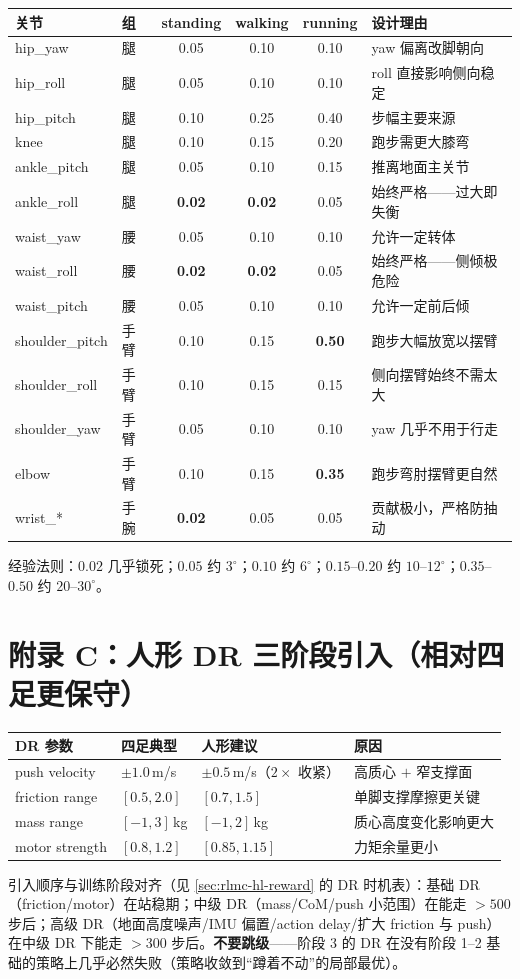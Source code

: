 \begin{center}
\small
\begin{tabular}{llccc l}
\hline
关节 & 组 & standing & walking & running & 设计理由 \\
\hline
hip\_yaw & 腿 & 0.05 & 0.10 & 0.10 & yaw 偏离改脚朝向 \\
hip\_roll & 腿 & 0.05 & 0.10 & 0.10 & roll 直接影响侧向稳定 \\
hip\_pitch & 腿 & 0.10 & 0.25 & 0.40 & 步幅主要来源 \\
knee & 腿 & 0.10 & 0.15 & 0.20 & 跑步需更大膝弯 \\
ankle\_pitch & 腿 & 0.05 & 0.10 & 0.15 & 推离地面主关节 \\
ankle\_roll & 腿 & \textbf{0.02} & \textbf{0.02} & 0.05 & 始终严格——过大即失衡 \\
waist\_yaw & 腰 & 0.05 & 0.10 & 0.10 & 允许一定转体 \\
waist\_roll & 腰 & \textbf{0.02} & \textbf{0.02} & 0.05 & 始终严格——侧倾极危险 \\
waist\_pitch & 腰 & 0.05 & 0.10 & 0.10 & 允许一定前后倾 \\
shoulder\_pitch & 手臂 & 0.10 & 0.15 & \textbf{0.50} & 跑步大幅放宽以摆臂 \\
shoulder\_roll & 手臂 & 0.10 & 0.15 & 0.15 & 侧向摆臂始终不需太大 \\
shoulder\_yaw & 手臂 & 0.05 & 0.10 & 0.10 & yaw 几乎不用于行走 \\
elbow & 手臂 & 0.10 & 0.15 & \textbf{0.35} & 跑步弯肘摆臂更自然 \\
wrist\_* & 手腕 & \textbf{0.02} & 0.05 & 0.05 & 贡献极小，严格防抽动 \\
\hline
\end{tabular}
\end{center}

经验法则：$0.02$ 几乎锁死；$0.05$ 约 $3^\circ$；$0.10$ 约 $6^\circ$；$0.15$--$0.20$ 约 $10$--$12^\circ$；$0.35$--$0.50$ 约 $20$--$30^\circ$。

\section*{附录 C：人形 DR 三阶段引入（相对四足更保守）}

\begin{center}
\small
\begin{tabular}{p{2.6cm}p{2.0cm}p{3.2cm}p{4.0cm}}
\hline
DR 参数 & 四足典型 & 人形建议 & 原因 \\
\hline
push velocity & $\pm1.0$\,m/s & $\pm0.5$\,m/s（$2\times$ 收紧） & 高质心 $+$ 窄支撑面 \\
friction range & $[0.5,2.0]$ & $[0.7,1.5]$ & 单脚支撑摩擦更关键 \\
mass range & $[-1,3]$\,kg & $[-1,2]$\,kg & 质心高度变化影响更大 \\
motor strength & $[0.8,1.2]$ & $[0.85,1.15]$ & 力矩余量更小 \\
\hline
\end{tabular}
\end{center}

引入顺序与训练阶段对齐（见 \cref{sec:rlmc-hl-reward} 的 DR 时机表）：基础 DR（friction/motor）在站稳期；中级 DR（mass/CoM/push 小范围）在能走 $>500$ 步后；高级 DR（地面高度噪声/IMU 偏置/action delay/扩大 friction 与 push）在中级 DR 下能走 $>300$ 步后。\textbf{不要跳级}——阶段 3 的 DR 在没有阶段 1--2 基础的策略上几乎必然失败（策略收敛到“蹲着不动”的局部最优）。

